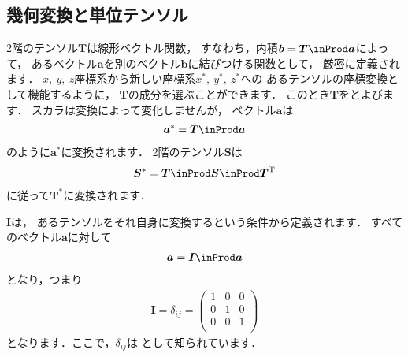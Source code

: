 \subsection{幾何変換と単位テンソル}
\label{ssec:1.3.7}
2階のテンソル$\bm{T}$は線形ベクトル関数，
すなわち，内積$\bm{b} = \bm{T} \inProd \bm{a}$によって，
あるベクトル$\bm{a}$を別のベクトル$\bm{b}$に結びつける関数として，
厳密に定義されます．
$x,\ y,\ z$座標系から新しい座標系$x^{*},\ y^{*},\ z^{*}$への
あるテンソルの座標変換として機能するように，
$\bm{T}$の成分を選ぶことができます．
このとき$\bm{T}$をとよびます．
スカラは変換によって変化しませんが，
ベクトル$\bm{a}$は
\begin{align}
 \label{eq:1.25}
 \bm{a}^{*} = \bm{T} \inProd \bm{a}
\end{align}
のように$\bm{a}^{*}$に変換されます．
2階のテンソル$\bm{S}$は
\begin{align}
 \label{eq:1.26}
 \bm{S}^{*} = \bm{T} \inProd \bm{S} \inProd \bm{T}^{\mathrm{T}}
\end{align}
に従って$\bm{T}^{*}$に変換されます．

$\bm{I}$は，
あるテンソルをそれ自身に変換するという条件から定義されます．
すべてのベクトル$\bm{a}$に対して
\begin{align}
 \label{eq:1.27}
 \bm{a} = \bm{I} \inProd \bm{a}
\end{align}
となり，つまり
\begin{align}
 \label{eq:1.28}
 \bm{I} = \delta_{ij} =
 \begin{pmatrix}
  1 & 0 & 0 \\
  0 & 1 & 0 \\
  0 & 0 & 1 \\
 \end{pmatrix}
\end{align}
となります．ここで，$\delta_{ij}$は
として知られています．


